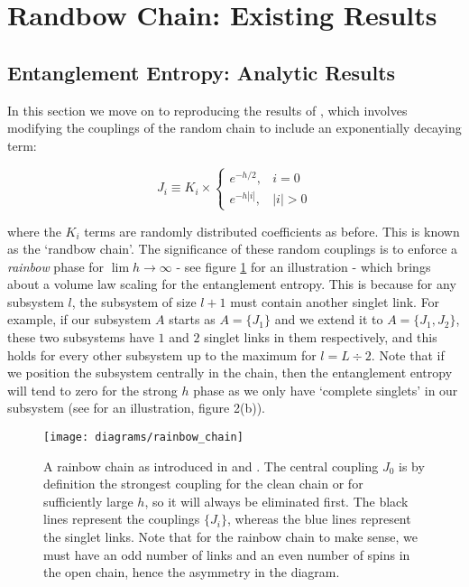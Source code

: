 \section{Randbow Chain: Existing Results}\label{sec:randbow_old_results}
\subsection{Entanglement Entropy: Analytic Results}\label{sec:randbow_old_results}
In this section we move on to reproducing the results of \cite{paola2018}, which involves modifying the couplings of the random chain to include an exponentially decaying term:

\begin{equation}\label{eq:randbow_couplings}
J_{i} \equiv K_{i} \times \begin{cases}e^{-h / 2}, & i=0 \\ e^{-h|i|}, & |i|>0\end{cases}
\end{equation}

where the $K_i$ terms are randomly distributed coefficients as before. This is known as the `randbow chain'. The significance of these random couplings is to enforce a \textit{rainbow} phase for $\lim h \to \infty$ \cite{Vitagliano2010} - see figure \ref{fig:rainbow_chain} for an illustration - which brings about a volume law scaling for the entanglement entropy. This is because for any subsystem $l$, the subsystem of size $l + 1$ must contain another singlet link. For example, if our subsystem $A$ starts as $A = \{J_1\}$ and we extend it to $A = \{J_1, J_2\}$, these two subsystems have $1$ and $2$ singlet links in them respectively, and this holds for every other subsystem up to the maximum for $l = L \div 2$. Note that if we position the subsystem centrally in the chain, then the entanglement entropy will tend to zero for the strong $h$ phase as we only have  `complete singlets' in our subsystem (see \cite{Vitagliano2010} for an illustration, figure 2(b)).

\begin{figure}[h]
	\centering
	\texttt{[image: diagrams/rainbow\_chain]}	
	\caption{A rainbow chain as introduced in \cite{Vitagliano2010} and \cite{paola2018}. The central coupling $J_0$ is by definition the strongest coupling for the clean chain or for sufficiently large $h$, so it will always be eliminated first. The black lines represent the couplings $\{J_i\}$, whereas the blue lines represent the singlet links. Note that for the rainbow chain to make sense, we must have an odd number of links and an even number of spins in the open chain, hence the asymmetry in the diagram.}
	\label{fig:rainbow_chain}
\end{figure}

